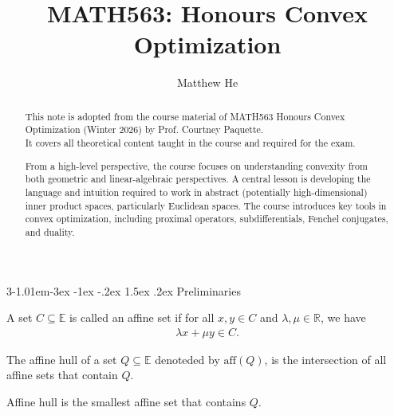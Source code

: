 \documentclass{tufte-handout}
\title{MATH563: Honours Convex Optimization}
\author[Matthew He]{Matthew He}
\makeatletter
\renewcommand{\section}{\@startsection{section}%
    {3}{-1.01em}{-3ex \@plus -1ex \@minus -.2ex}%
    {1.5ex \@plus .2ex}
    {\hspace*{-5.5em}\fcolorbox{blue}{blue}{\parbox[c][1.0ex][b]{4em}{\phantom{space}}}
    \normalfont\Large\itshape\color{blue}}}
\makeatother
\begin{document}
\maketitle%

\begin{abstract}
\noindent This note is adopted from the course material of MATH563 Honours Convex Optimization (Winter 2026) by Prof. Courtney Paquette.\\
It covers all theoretical content taught in the course and required for the exam.

From a high-level perspective, the course focuses on understanding convexity from both geometric and linear-algebraic perspectives.
A central lesson is developing the 
language and intuition required to work in abstract 
(potentially high-dimensional) inner product spaces, particularly Euclidean spaces. 
The course introduces key tools in convex optimization, 
including proximal operators, subdifferentials, Fenchel conjugates, and duality.

\end{abstract}

\section{Preliminaries}
\begin{Definition}
    A set \( C \subseteq \mathbb{E} \) is called an
    affine set if for all \( x, y \in C \) and \( \lambda,\mu \in \mathbb{R} \), we have
    \begin{align}
    \lambda x + \mu y \in C.
    \end{align}
\end{Definition}

\begin{Definition}
    The affine hull of a set \( Q \subseteq \mathbb{E} \)
    denoteded by \( \text{aff}(Q) \), is the intersection of all affine sets that 
    contain \( Q \). 
\end{Definition}
Affine hull is the smallest affine set that contains \( Q \).
\end{document}

